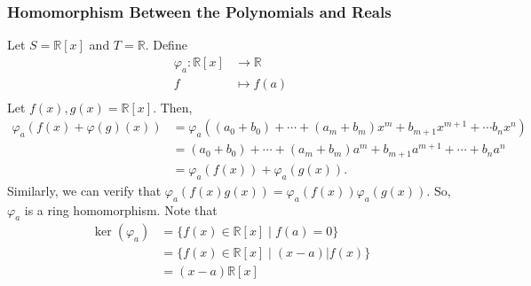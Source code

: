 \documentclass[8pt]{extarticle}
\newcommand{\R}{\mathbb{R}}
\begin{document}
  \subsubsection{Homomorphism Between the Polynomials and Reals}%
  Let $S = \R[x]$ and $T = \R$. Define
  \begin{align*}
    \varphi_{a}: \R[x]&\rightarrow \R\\
    f&\mapsto f(a)\\
  \end{align*}
  Let $f(x),g(x) = \R[x]$. Then,
  \begin{align*}
    \varphi_a(f(x) + \varphi(g)(x)) &= \varphi_a((a_0 + b_0) + \cdots + (a_m + b_m)x^m + b_{m+1}x^{m+1} + \cdots b_nx^n)\\
                                    &= (a_0 + b_0) + \cdots + (a_m + b_m)a^m + b_{m+1}a^{m+1} + \cdots + b_na^n\\
                                    &= \varphi_a(f(x)) + \varphi_a(g(x)).
  \end{align*}
  Similarly, we can verify that $\varphi_a(f(x)g(x)) = \varphi_a(f(x))\varphi_a(g(x))$. So, $\varphi_a$ is a ring homomorphism. Note that
  \begin{align*}
    \ker(\varphi_a) &= \{f(x)\in \R[x]\mid f(a) = 0\}\\
                    &= \{f(x)\in \R[x]\mid (x-a)|f(x)\}\\
                    &= (x-a)\R[x]
  \end{align*}
\end{document}
